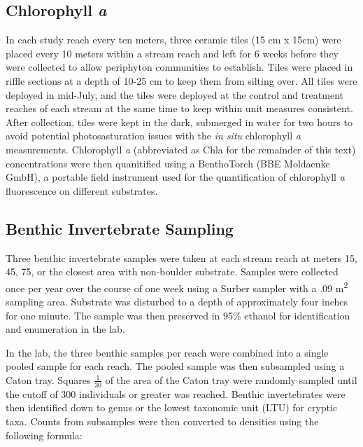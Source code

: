 \documentclass[double,12pt]{beavtex}
\begin{document}
  \subsection*{\texorpdfstring{Chlorophyll
  \emph{a}}{Chlorophyll a}}\label{chlorophyll-a}
  
  In each study reach every ten meters, three ceramic tiles (15 cm x 15cm)
  were placed every 10 meters within a stream reach and left for 6 weeks
  before they were collected to allow periphyton communities to establish.
  Tiles were placed in riffle sections at a depth of 10-25 cm to keep them
  from silting over. All tiles were deployed in mid-July, and the tiles
  were deployed at the control and treatment reaches of each stream at the
  same time to keep within unit measures consistent. After collection,
  tiles were kept in the dark, submerged in water for two hours to avoid
  potential photosasturation issues with the \emph{in situ} chlorophyll
  \emph{a} measurements. Chlorophyll \emph{a} (abbreviated as Chla for the
  remainder of this text) concentrations were then quanitified using a
  BenthoTorch (BBE Moldaenke GmbH), a portable field instrument used for
  the quantification of chlorophyll \emph{a} fluorescence on different
  substrates.
  
  \subsection*{Benthic Invertebrate
  Sampling}\label{benthic-invertebrate-sampling}
  
  Three benthic invertebrate samples were taken at each stream reach at
  meters 15, 45, 75, or the closest area with non-boulder substrate.
  Samples were collected once per year over the course of one week using a
  Surber sampler with a .09 m\textsuperscript{2} sampling area. Substrate
  was disturbed to a depth of approximately four inches for one minute.
  The sample was then preserved in 95\% ethanol for identification and
  enumeration in the lab.
  
  In the lab, the three benthic samples per reach were combined into a
  single pooled sample for each reach. The pooled sample was then
  subsampled using a Caton tray. Squares \(\frac{1} {30}\) of the area of
  the Caton tray were randomly sampled until the cutoff of 300 individuals
  or greater was reached. Benthic invertebrates were then identified down
  to genus or the lowest taxonomic unit (LTU) for cryptic taxa. Counts
  from subsamples were then converted to densities using the following
  formula:
  
\end{document}
